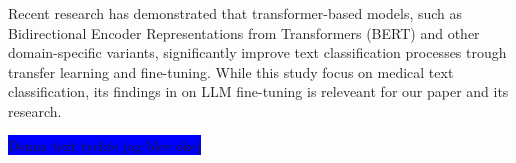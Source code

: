 \documentclass{article}
\begin{document}
Recent research has demonstrated that transformer-based models, such as Bidirectional Encoder Representations from
Transformers (BERT) and other domain-specific variants, significantly improve text classification processes trough transfer 
learning and fine-tuning\cite{Nazyrova2024}. While this study focus on medical text classification, its findings in
 on LLM fine-tuning is releveant for our paper and its research.

\colorbox{blue}{Denna text tyckte jag blev okej}




\end{document}
